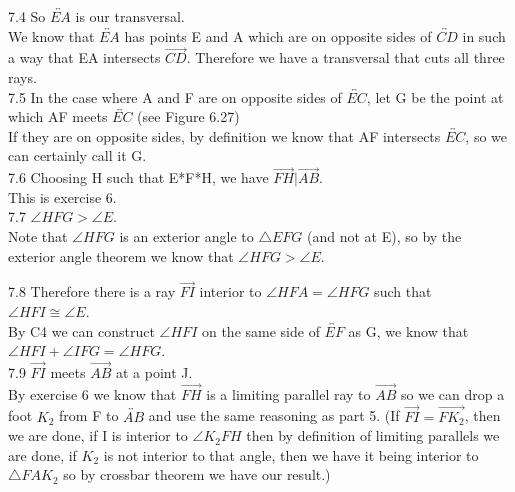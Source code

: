 \documentclass[12pt,letterpaper]{article}
\begin{document}
7.4 So $\overleftrightarrow{EA}$ is our transversal.\\

We know that $\overleftrightarrow{EA}$ has points E and A which are on opposite sides of $\overleftrightarrow{CD}$ in such a way that EA intersects $\overrightarrow{CD}$.  Therefore we have a transversal that cuts all three rays.\\


7.5 In the case where A and F are on opposite sides of $\overleftrightarrow{EC}$, let G be the point at which AF meets $\overleftrightarrow{EC}$ (see Figure 6.27)\\

If they are on opposite sides, by definition we know that AF intersects $\overleftrightarrow{EC}$, so we can certainly call it G.  \\



7.6 Choosing H such that E*F*H, we have $\overrightarrow{FH} | \overrightarrow{AB}$. \\ 

This is exercise 6.\\


7.7 $\angle HFG > \angle E$. \\

Note that $\angle HFG$ is an exterior angle to $\triangle EFG$ (and not at E), so by the exterior angle theorem we know that $\angle HFG > \angle E$.

7.8 Therefore there is a ray $\overrightarrow{FI}$ interior to $\angle HFA = \angle HFG$ such that $\angle HFI \cong \angle E$.  \\

By C4 we can construct $\angle HFI$ on the same side of $\overleftrightarrow{EF}$ as G, we know that $\angle HFI + \angle IFG = \angle HFG$.\\




7.9 $\overrightarrow{FI}$ meets $\overrightarrow{AB}$ at a point J. \\

By exercise 6 we know that $\overrightarrow{FH}$ is a limiting parallel ray to $\overrightarrow{AB}$ so we can drop a foot $K_2$ from F to $\overleftrightarrow{AB}$ and use the same reasoning as part 5. (If $\overrightarrow{FI} = \overrightarrow{FK_2}$, then we are done, if I is interior to $\angle K_2 FH$ then by definition of limiting parallels we are done, if $K_2$ is not interior to that angle, then we have it being interior to $\triangle FAK_2$ so by crossbar theorem we have our result.)\\
\end{document}
